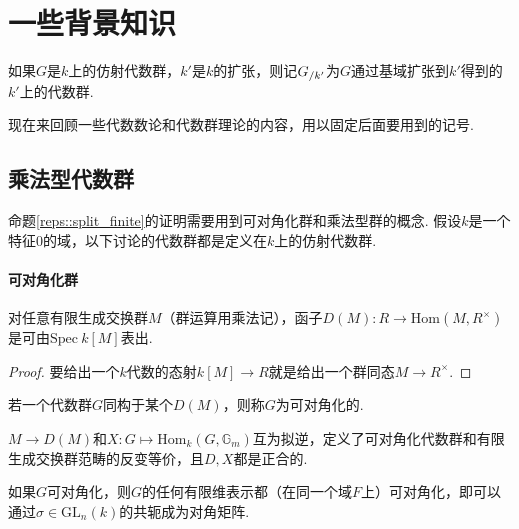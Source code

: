 \section{一些背景知识}

如果$G$是$k$上的仿射代数群，$k'$是$k$的扩张，则记${G}_{/k'}$为$G$通过基域扩张到$k'$得到的$k'$上的代数群.

现在来回顾一些代数数论和代数群理论的内容，用以固定后面要用到的记号.

\subsection{乘法型代数群}

命题\ref{reps::split_finite}的证明需要用到可对角化群和乘法型群的概念.
假设$k$是一个特征$0$的域，以下讨论的代数群都是定义在$k$上的仿射代数群.

\paragraph*{可对角化群}

\begin{cprop}
    对任意有限生成交换群$M$（群运算用乘法记），函子$D(M): R\to \mathrm{Hom}(M, R^{\times})$是可由$\mathrm{Spec}\ k[M]$表出.
\end{cprop}

\begin{proof}
    要给出一个$k$代数的态射$k[M]\to R$就是给出一个群同态$M\to R^{\times}$.
\end{proof}

\begin{cdef}
    若一个代数群$G$同构于某个$D(M)$，则称$G$为可对角化的.
\end{cdef}

\begin{cprop}
    $M\to D(M)$和$X: G\mapsto \mathrm{Hom}_k(G, \mathbb{G}_m)$互为拟逆，定义了可对角化代数群和有限生成交换群范畴的反变等价，且$D,X$都是正合的.
\end{cprop}


\begin{cprop}
    如果$G$可对角化，则$G$的任何有限维表示都（在同一个域$F$上）可对角化，即可以通过$\sigma\in\mathrm{GL}_n(k)$的共轭成为对角矩阵.
\end{cprop}

